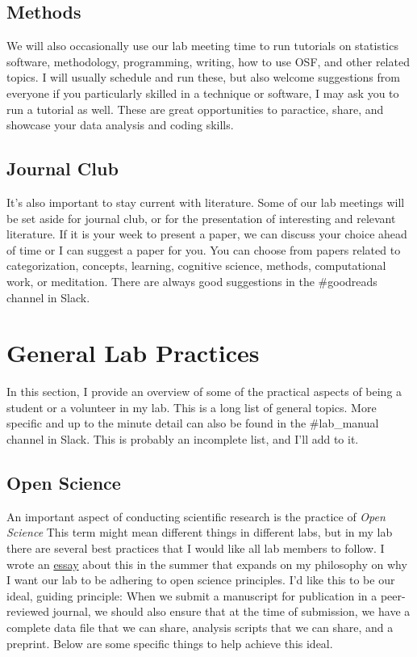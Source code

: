 \documentclass{article}
\begin{document}
\subsection{Methods} 
We will also occasionally use our lab meeting time to run tutorials on statistics software, methodology, programming, writing, how to use OSF, and other related topics. I will usually schedule and run these, but also welcome suggestions from everyone if you particularly skilled in a technique or software, I may ask you to run a tutorial as well. These are great opportunities to paractice, share, and showcase your data analysis and coding skills.

\subsection {Journal Club} 
It's also important to stay current with literature. Some of our lab meetings will be set aside for journal club, or for the presentation of interesting and relevant literature. If it is your week to present a paper, we can discuss your choice ahead of time or I can suggest a paper for you. You can choose from papers related to categorization, concepts, learning, cognitive science, methods, computational work, or meditation. There are always good suggestions in the \#goodreads channel in Slack.  


\section{General Lab Practices}\label{sec:LabPrac}
In this section, I provide an overview of some of the practical aspects of being a student or a volunteer in my lab. This is a long list of general topics. More specific and up to the minute detail can also be found in the \#lab\_manual channel in Slack. This is probably an incomplete list, and I'll add to it.


\subsection{Open Science} 
An important aspect of conducting scientific research is the practice of \textit{Open Science} This term might mean different things in different labs, but in my lab there are several best practices that I would like all lab members to follow. I wrote an \href{http://jpminda.com/2018/07/12/open-science-my-list-of-best-practices}{essay} about this in the summer that expands on my philosophy on why I want our lab to be adhering to open science principles. I'd like this to be our ideal, guiding principle: When we submit a manuscript for publication in a peer-reviewed journal, we should also ensure that at the time of submission, we have a complete data file that we can share, analysis scripts that we can share, and a preprint. Below are some specific things to help achieve this ideal.
\end{document}
